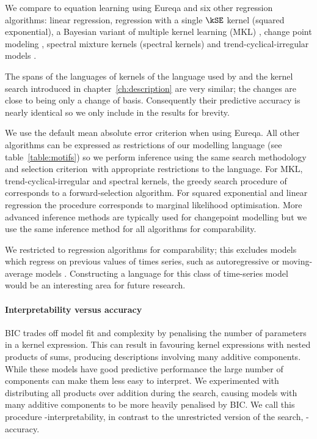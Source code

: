 We compare \procedurename{} to equation learning using Eureqa \citep{Nutonian2011-el} and six other regression algorithms: linear regression, \gp{} regression with a single $\kSE$ kernel (squared exponential), a Bayesian variant of multiple kernel learning (MKL) \citep[e.g.][]{Bach2004-lb}, change point modeling \citep[e.g.][]{Garnett2010-rd, Saatci2010-el, Fox2012-fm}, spectral mixture kernels \citep{Wilson2013-eq} (spectral kernels) and trend-cyclical-irregular models \citep[e.g.][]{Lind2006-th}.

The spans of the languages of kernels of the language used by \procedurename{} and the kernel search introduced in chapter~\ref{ch:description} are very similar; the changes are close to being only a change of basis.
Consequently their predictive accuracy is nearly identical so we only include \procedurename{} in the results for brevity.

We use the default mean absolute error criterion when using Eureqa.
All other algorithms can be expressed as restrictions of our modelling language (see table~\ref{table:motifs}) so we perform inference using the same search methodology and selection criterion\footnotemark~with appropriate restrictions to the language.
For MKL, trend-cyclical-irregular and spectral kernels, the greedy search procedure of \procedurename{} corresponds to a forward-selection algorithm.
For squared exponential and linear regression the procedure corresponds to marginal likelihood optimisation.
More advanced inference methods are typically used for changepoint modelling but we use the same inference method for all algorithms for comparability.

We restricted to regression algorithms for comparability; this excludes models which regress on previous values of times series, such as autoregressive or moving-average models \citep[e.g.][]{Box1976-qk}.
Constructing a language for this class of time-series model would be an interesting area for future research.

\paragraph{Interpretability versus accuracy}

BIC trades off model fit and complexity by penalising the number of parameters in a kernel expression.
This can result in \procedurename{} favouring kernel expressions with nested products of sums, producing descriptions involving many additive components.
While these models have good predictive performance the large number of components can make them less easy to interpret.
We experimented with distributing all products over addition during the search, causing models with many additive components to be more heavily penalised by BIC.
We call this procedure \procedurename{}-interpretability, in contrast to the unrestricted version of the search, \procedurename{}-accuracy.

